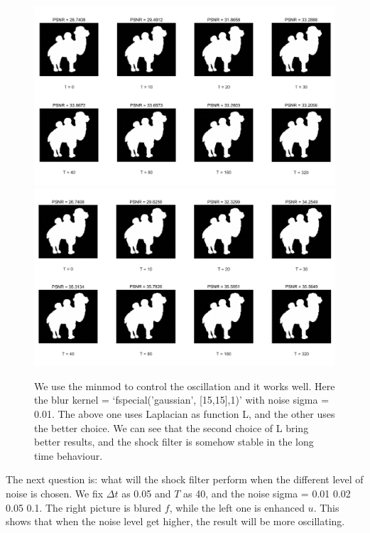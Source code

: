 \documentclass{article}
\begin{document}
\begin{figure}[H]
\begin{center}
\includegraphics[scale=.31]{5.png}
\includegraphics[scale=.31]{6.png}
\end{center}
\caption{We use the minmod to control the oscillation and it works well. Here the blur kernel = `fspecial('gaussian', [15,15],1)' with noise sigma = 0.01. The above one uses Laplacian as function L, and the other uses the better choice. We can see that the second choice of L bring better results, and the shock filter is somehow stable in the long time behaviour.}
\end{figure}

The next question is: what will the shock filter perform when the different level of noise is chosen. We fix $\Delta t$ as 0.05 and $T$ as 40, and the noise sigma = 0.01 0.02 0.05 0.1. The right picture is blured $f$, while the left one is enhanced $u$. This shows that when the noise level get higher, the result will be more oscillating.
\end{document}
